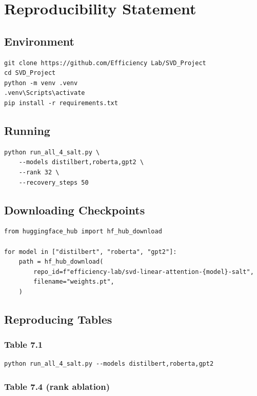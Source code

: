 
\section{Reproducibility Statement}

\subsection{Environment}

\begin{lstlisting}
git clone https://github.com/Efficiency Lab/SVD_Project
cd SVD_Project
python -m venv .venv
.venv\Scripts\activate
pip install -r requirements.txt
\end{lstlisting}

\subsection{Running}

\begin{lstlisting}
python run_all_4_salt.py \
    --models distilbert,roberta,gpt2 \
    --rank 32 \
    --recovery_steps 50
\end{lstlisting}

\subsection{Downloading Checkpoints}

\begin{lstlisting}
from huggingface_hub import hf_hub_download

for model in ["distilbert", "roberta", "gpt2"]:
    path = hf_hub_download(
        repo_id=f"efficiency-lab/svd-linear-attention-{model}-salt",
        filename="weights.pt",
    )
\end{lstlisting}

\subsection{Reproducing Tables}

\subsubsection{Table 7.1}

\begin{lstlisting}
python run_all_4_salt.py --models distilbert,roberta,gpt2
\end{lstlisting}

\subsubsection{Table 7.4 (rank ablation)}

